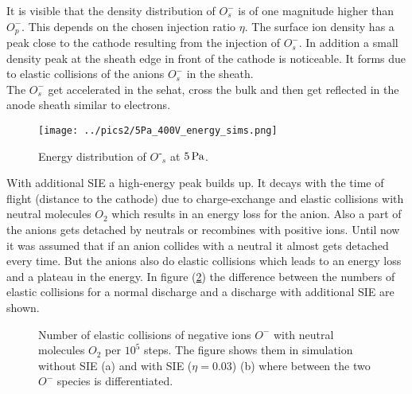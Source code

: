 
It is visible that the density distribution of $O^-_s$ is of one magnitude higher than $O^-_p$. 
This depends on the chosen injection ratio $\eta$. 
The surface ion density has a peak close to the cathode resulting from the injection of $O^-_s$. 
In addition a small density peak at the sheath edge in front of the cathode is noticeable. 
It forms due to elastic collisions of the anions $O^-_s$ in the sheath. \\
The $O^-_s$ get accelerated in the sehat, cross the bulk and then get reflected in the anode sheath similar to electrons.\\
\begin{figure}[htbp]
    \centering
    \texttt{[image: ../pics2/5Pa\_400V\_energy\_sims.png]}
    \caption{Energy distribution of $O⁻_s$ at $5\,\mathrm{Pa}$.}
    \label{fig:sims_distribution_top}
\end{figure}
With additional SIE a high-energy peak builds up. 
It decays with the time of flight (distance to the cathode) due to charge-exchange and elastic collisions with neutral molecules $O_2$ which results in an energy loss for the anion.
Also a part of the anions gets detached by neutrals or recombines with positive ions.
Until now it was assumed that if an anion collides with a neutral it almost gets detached every time.
But the anions also do elastic collisions which leads to an energy loss and a plateau in the energy. 
In figure (\ref{fig:coll_sims}) the difference between the numbers of elastic collisions for a normal discharge and a discharge with additional SIE are shown. 
\begin{figure}[htbp]
    \centering
    \caption{Number of elastic collisions of negative ions $O^-$ with neutral molecules  $O_2$ per $10^5$ steps. 
    The figure shows them in simulation without SIE (a) and with SIE ($\eta=0.03$) (b) where between the two $O^-$ species is differentiated.}
    \label{fig:coll_sims}
\end{figure}
